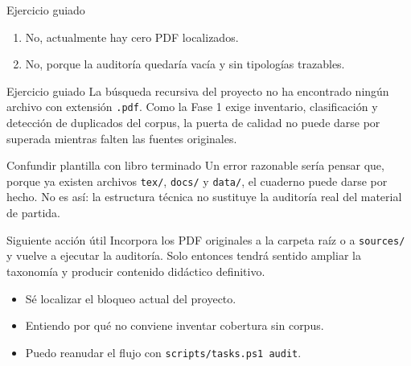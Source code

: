 \begin{shortanswer}{Ejercicio guiado}
\begin{enumerate}
  \item No, actualmente hay cero PDF localizados.
  \item No, porque la auditoría quedaría vacía y sin tipologías trazables.
\end{enumerate}
\end{shortanswer}

\begin{fullsolution}{Ejercicio guiado}
La búsqueda recursiva del proyecto no ha encontrado ningún archivo con extensión \texttt{.pdf}.
Como la Fase 1 exige inventario, clasificación y detección de duplicados del corpus, la
puerta de calidad no puede darse por superada mientras falten las fuentes originales.
\end{fullsolution}

\begin{commonerror}{Confundir plantilla con libro terminado}
Un error razonable sería pensar que, porque ya existen archivos \texttt{tex/}, \texttt{docs/} y \texttt{data/},
el cuaderno puede darse por hecho. No es así: la estructura técnica no sustituye la auditoría
real del material de partida.
\end{commonerror}

\begin{challenge}{Siguiente acción útil}
Incorpora los PDF originales a la carpeta raíz o a \texttt{sources/} y vuelve a ejecutar la
auditoría. Solo entonces tendrá sentido ampliar la taxonomía y producir contenido didáctico
definitivo.
\end{challenge}

\begin{selfcheck}
\begin{itemize}
  \item Sé localizar el bloqueo actual del proyecto.
  \item Entiendo por qué no conviene inventar cobertura sin corpus.
  \item Puedo reanudar el flujo con \texttt{scripts/tasks.ps1 audit}.
\end{itemize}
\end{selfcheck}

